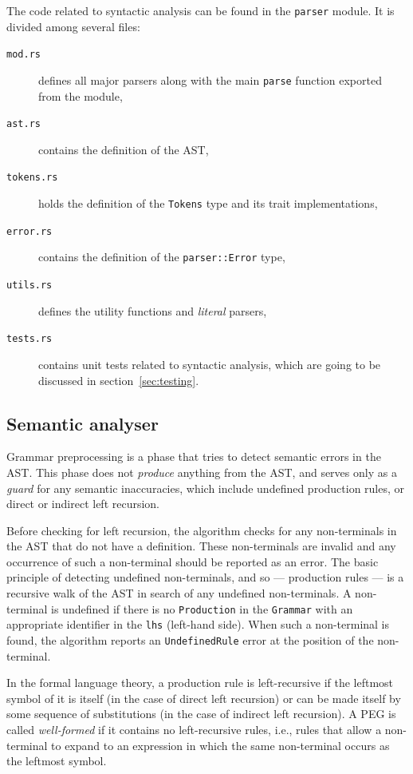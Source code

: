 \documentclass[english,engineering]{wizthesis}
\newcommand{\paraphrase}[1]{#1}
\begin{document}
The code related to syntactic analysis can be found in the \texttt{parser}
module. It is divided among several files:
\begin{description}
  \item[\texttt{mod.rs}] defines all major parsers along with the main
  \texttt{parse} function exported from the module,
  \item[\texttt{ast.rs}] contains the definition of the AST,
  \item[\texttt{tokens.rs}] holds the definition of the \texttt{Tokens}
  type and its trait implementations,
  \item[\texttt{error.rs}] contains the definition of the \texttt{parser::Error}
  type,
  \item[\texttt{utils.rs}] defines the utility functions and \emph{literal}
  parsers,
  \item[\texttt{tests.rs}] contains unit tests related to syntactic analysis,
  which are going to be discussed in section~\ref{sec:testing}.
\end{description}

\newpage

\subsection{Semantic analyser} \label{sbs:semantic-analyser}

Grammar preprocessing is a phase that tries to detect semantic errors in the
AST. This phase does not \emph{produce} anything from the AST, and serves only
as a \emph{guard} for any semantic inaccuracies, which include undefined
production rules, or direct or indirect left recursion.

Before checking for left recursion, the algorithm checks for any non-terminals
in the AST that do not have a definition. These non-terminals are invalid and
any occurrence of such a non-terminal should be reported as an error. The basic
principle of detecting undefined non-terminals, and so --- production rules ---
is a recursive walk of the AST in search of any undefined non-terminals. A
non-terminal is undefined if there is no \texttt{Production} in the
\texttt{Grammar} with an appropriate identifier in the \texttt{lhs} (left-hand
side). When such a non-terminal is found, the algorithm reports an
\texttt{UndefinedRule} error at the position of the non-terminal.

\paraphrase{In the formal language theory, a production rule is left-recursive
if the leftmost symbol of it is itself (in the case of direct left recursion) or
can be made itself by some sequence of substitutions (in the case of indirect
left recursion). A PEG is called \emph{well-formed} if it contains no
left-recursive rules, i.e., rules that allow a non-terminal to expand to an
expression in which the same non-terminal occurs as the leftmost symbol.}
\end{document}
